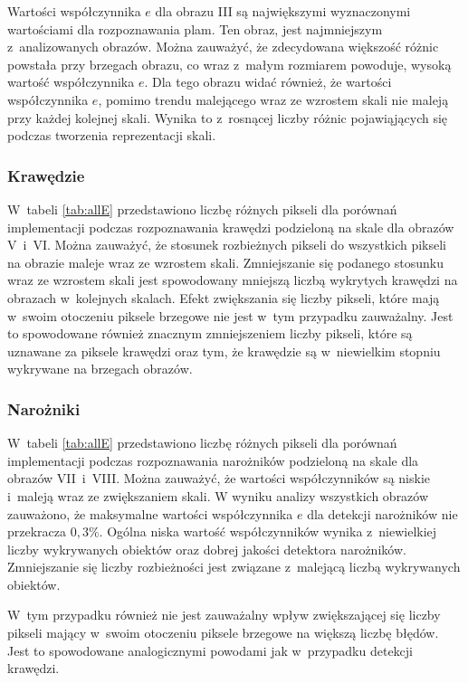 Wartości współczynnika $ e $ dla obrazu III są największymi wyznaczonymi wartościami dla rozpoznawania plam. Ten obraz, jest najmniejszym z~analizowanych obrazów. Można zauważyć, że zdecydowana większość różnic powstała przy brzegach obrazu, co wraz z~małym rozmiarem powoduje, wysoką wartość współczynnika $ e $. Dla tego obrazu widać również, że wartości współczynnika $ e $, pomimo trendu malejącego wraz ze wzrostem skali nie maleją przy każdej kolejnej skali. Wynika to z~rosnącej liczby różnic pojawiąjących się podczas tworzenia reprezentacji skali.


\subsubsection{Krawędzie}
\label{subsubsec:krawedzieTabele}

W~tabeli \ref{tab:allE} przedstawiono liczbę różnych pikseli dla porównań implementacji podczas rozpoznawania krawędzi podzieloną na skale dla obrazów V~i~VI. Można zauważyć, że stosunek rozbieżnych pikseli do wszystkich pikseli na obrazie maleje wraz ze wzrostem skali. Zmniejszanie się podanego stosunku wraz ze wzrostem skali jest spowodowany mniejszą liczbą wykrytych krawędzi na obrazach w~kolejnych skalach. Efekt zwiększania się liczby pikseli, które mają w~swoim otoczeniu piksele brzegowe nie jest w~tym przypadku zauważalny. Jest to spowodowane również znacznym zmniejszeniem liczby pikseli, które są uznawane za piksele krawędzi oraz tym, że krawędzie są w~niewielkim stopniu wykrywane na brzegach obrazów.

\subsubsection{Narożniki}
\label{subsubsec:naroznikiTabele}

W~tabeli \ref{tab:allE} przedstawiono liczbę różnych pikseli dla porównań implementacji podczas rozpoznawania narożników podzieloną na skale dla obrazów VII~i~VIII. Można zauważyć, że wartości współczynników są niskie i~maleją wraz ze zwiększaniem skali. W wyniku analizy wszystkich obrazów zauważono, że maksymalne wartości współczynnika $ e $ dla detekcji narożników nie przekracza $ 0,3 \% $. Ogólna niska wartość współczynników wynika z~niewielkiej liczby wykrywanych obiektów oraz dobrej jakości detektora narożników. Zmniejszanie się liczby rozbieżności jest związane z~malejącą liczbą wykrywanych obiektów.

W~tym przypadku również nie jest zauważalny wpływ zwiększającej się liczby pikseli mający w~swoim otoczeniu piksele brzegowe na większą liczbę błędów. Jest to spowodowane analogicznymi powodami jak w~przypadku detekcji krawędzi.

